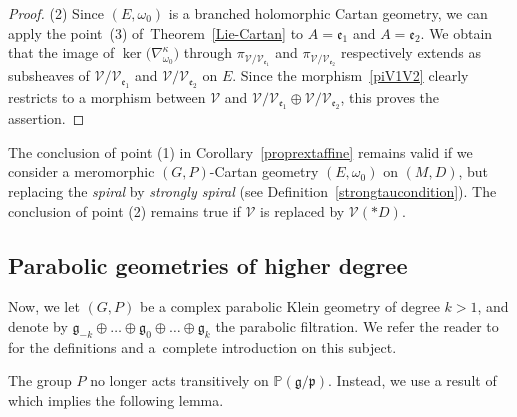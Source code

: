 \documentclass[pdftex]{sigma}
\numberwithin{equation}{section}
\begin{document}
\begin{proof}
(2) Since $(E,\omega_0)$ is a branched holomorphic Cartan geometry, we can apply the point~(3) of~Theorem~\ref{Lie-Cartan} to $A=\mathfrak{e}_1$ and $A=\mathfrak{e}_2$. We obtain that the image of $\ker\big(\nabla^{\kappa}_{\omega_0}\big)$ through $\pi_{\mathcal{V}/\mathcal{V}_{\mathfrak{e}_1}}$ and $\pi_{\mathcal{V}/\mathcal{V}_{\mathfrak{e}_2}}$ respectively extends as subsheaves of $\mathcal{V}/\mathcal{V}_{\mathfrak{e}_1}$ and $\mathcal{V}/\mathcal{V}_{\mathfrak{e}_2}$ on $E$. Since the morphism~\eqref{piV1V2} clearly restricts to a morphism between $\mathcal{V}$ and $\mathcal{V}/\mathcal{V}_{\mathfrak{e}_1} \oplus \mathcal{V}/\mathcal{V}_{\mathfrak{e}_2}$, this proves the assertion.
\end{proof}

\begin{Remark}\label{remarkmeromorphicproprext} The conclusion of point (1) in Corollary~\ref{proprextaffine} remains valid if we consider a meromorphic $(G,P)$-Cartan geometry $(E,\omega_0)$ on $(M,D)$, but replacing the \textit{spiral} by \textit{strongly spiral} (see Definition~\ref{strongtaucondition}). The conclusion of point (2) remains true if $\mathcal{V}$ is replaced by $\mathcal{V}(* D)$.
\end{Remark}

\subsection{Parabolic geometries of higher degree}
Now, we let $(G,P)$ be a complex parabolic Klein geometry of degree $k>1$, and denote by $\mathfrak{g}_{-k}\oplus \dots \oplus \mathfrak{g}_0 \oplus \dots\oplus \mathfrak{g}_k$ the parabolic filtration. We refer the reader to \cite{Cap} for the definitions and a~complete introduction on this subject.

 The group $P$ no longer acts transitively on $\mathbb{P}(\mathfrak{g}/\mathfrak{p})$. Instead, we use a result of \cite[Theorem, p.~13]{Cap4} which implies the following lemma.
\end{document}
